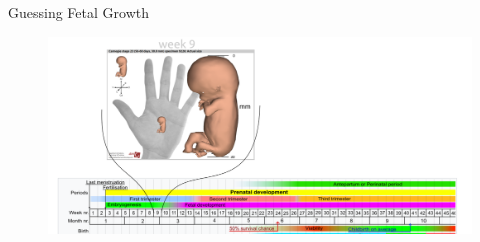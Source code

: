 {
\begin{frame}{Guessing Fetal Growth}
      \begin{figure}
        \centering
        \includegraphics[width=1.0\textwidth]{./figures/fetal-size/versions/drawing-v02.png}
      \end{figure}
\end{frame}
}


